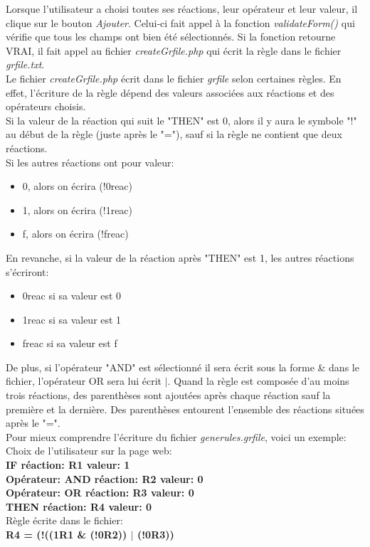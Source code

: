 Lorsque l'utilisateur a choisi toutes ses réactions, leur opérateur et leur valeur, il clique sur le bouton \emph{Ajouter}. Celui-ci fait appel à la fonction \emph{validateForm()} qui vérifie que tous les champs ont bien été sélectionnés. Si la fonction retourne VRAI, il fait appel au fichier \emph{createGrfile.php} qui écrit la règle dans le fichier \emph{grfile.txt}.\\
Le fichier \emph{createGrfile.php} écrit dans le fichier \emph{grfile} selon certaines règles. En effet, l'écriture de la règle dépend des valeurs associées aux réactions et des opérateurs choisis.\\

Si la valeur de la réaction qui suit le "THEN" est 0, alors il y aura le symbole "!" au début de la règle (juste après le "="), sauf si la règle ne contient que deux réactions.\\
Si les autres réactions ont pour valeur:
\begin{itemize}
\item 0, alors on écrira (!0reac)
\item 1, alors on écrira (!1reac)
\item f, alors on écrira (!freac)
\end{itemize}
En revanche, si la valeur de la réaction après "THEN" est 1, les autres réactions s'écriront:
\begin{itemize}
\item 0reac si sa valeur est 0
\item 1reac si sa valeur est 1
\item freac si sa valeur est f
\end{itemize}
De plus, si l'opérateur "AND" est sélectionné il sera écrit sous la forme \& dans le fichier, l'opérateur OR sera lui écrit $|$. Quand la règle est composée d'au moins trois réactions, des parenthèses sont ajoutées après chaque réaction sauf la première et la dernière. Des parenthèses entourent l'ensemble des réactions situées après le "=".\\

Pour mieux comprendre l'écriture du fichier \emph{generules.grfile}, voici un exemple:\\
Choix de l'utilisateur sur la page web:\\
\textbf{IF réaction: R1 valeur: 1\\
Opérateur: AND réaction: R2 valeur: 0\\
Opérateur: OR réaction: R3 valeur: 0\\
THEN réaction: R4 valeur: 0}\\

Règle écrite dans le fichier: \\
\textbf{R4 = (!((1R1 \& (!0R2)) $|$ (!0R3))}
